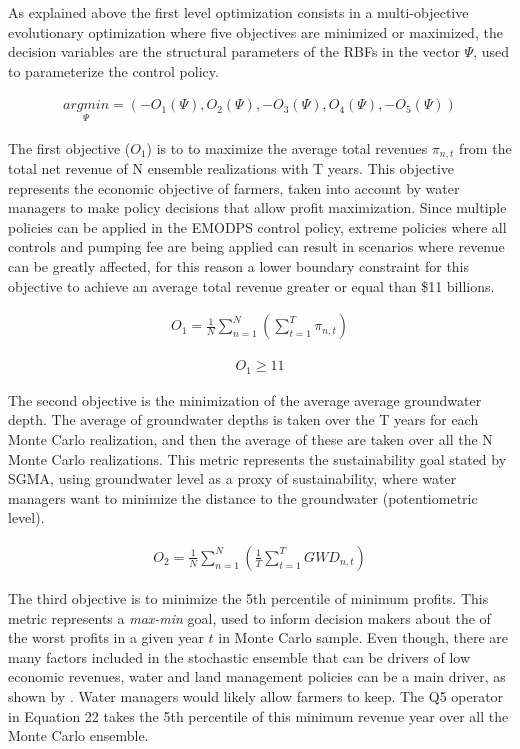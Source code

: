 \documentclass[11pt,a4paper]{article}
\begin{document}
As explained above the first level optimization consists in a multi-objective evolutionary optimization where five objectives are minimized or maximized, the decision variables are the structural parameters of the RBFs in the vector $\Psi$, used to parameterize the control policy. 

\begin{align}
\underset{\Psi}{argmin} = (-O_{1}(\Psi),O_{2}(\Psi),-O_{3}(\Psi),O_{4}(\Psi),-O_{5}(\Psi))
\end{align}

The first objective ($O_{1}$) is to to maximize the average total revenues $\pi_{n,t}$ from the total net revenue of N ensemble realizations with T years. This objective represents the economic objective of farmers, taken into account by water managers to make policy decisions that allow profit maximization. Since multiple policies can be applied in the EMODPS control policy, extreme policies where all controls and pumping fee are being applied can result in scenarios where revenue can be greatly affected, for this reason a lower boundary constraint for this objective to achieve an average total revenue greater or equal than \$11 billions.

\begin{align}
O_{1} = \frac{1}{N}\sum_{n=1}^N(\sum_{t=1}^T \pi_{n,t})
\end{align}


\begin{align}
O_{1} \geq 11
\end{align}

The second objective is the minimization of the average average groundwater depth. The average of groundwater depths is taken over the T years for each Monte Carlo realization, and then the average of these are taken over all the N Monte Carlo realizations. This metric represents the sustainability goal stated by SGMA, using groundwater level as a proxy of sustainability, where water managers want to minimize the distance to the groundwater (potentiometric level).

\begin{align}
O_{2} = \frac{1}{N}\sum_{n=1}^N(\frac{1}{T}\sum_{t=1}^T GWD_{n,t})
\end{align}

The third objective is to minimize the 5th percentile of minimum profits. This metric represents a \textit{max-min} goal, used to inform decision makers about the of the worst profits in a given year $t$ in Monte Carlo sample. Even though, there are many factors included in the stochastic ensemble that can be drivers of low economic revenues, water and land management policies can be a main driver, as shown by . Water managers would likely allow farmers to keep. The Q5 operator in Equation 22 takes the 5th percentile of this minimum revenue year over all the Monte Carlo ensemble. 
\end{document}

